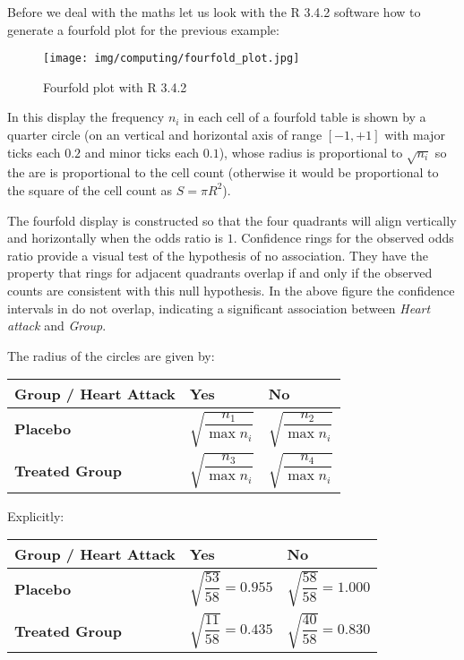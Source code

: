 	Before we deal with the maths let us look with the R 3.4.2 software how to generate a fourfold plot for the previous example:
	\begin{figure}[H]
		\centering
		\texttt{[image: img/computing/fourfold\_plot.jpg]}
		\caption{Fourfold plot with R 3.4.2}
	\end{figure}
	In this display the frequency $n_i$ in each cell of a fourfold table is shown by a quarter circle (on an vertical and horizontal axis of range $[-1,+1]$ with major ticks each $0.2$ and minor ticks each $0.1$), whose radius is proportional to $\sqrt{n_i}$ so the are is proportional to the cell count (otherwise it would be proportional to the square of the cell count as $S=\pi R^2$).
	
	The fourfold display is constructed so that the four quadrants will align vertically and horizontally when the odds ratio is $1$. Confidence rings for the observed odds ratio provide a visual test of the hypothesis of no association. They have the property that rings for adjacent quadrants overlap if and only if the observed counts are consistent with this null hypothesis. In the above figure the confidence intervals in do not overlap, indicating a significant association between \textit{Heart attack} and \textit{Group}. 
	
	The radius of the circles are given by:
	\begin{table}[H]
		\centering
		\begin{tabular}{|l|c|c|}
		\hline
		 Group / Heart Attack & \multicolumn{1}{l|}{\cellcolor[HTML]{9B9B9B}\textbf{Yes}} & \multicolumn{1}{l|}{\cellcolor[HTML]{9B9B9B}\textbf{No}} \\ \hline
		\cellcolor[HTML]{9B9B9B}\textbf{Placebo} & $\sqrt{\dfrac{n_1}{\max n_i}}$ & $\sqrt{\dfrac{n_2}{\max n_i}}$ \\ \hline
		\cellcolor[HTML]{9B9B9B}\textbf{Treated Group} & $\sqrt{\dfrac{n_3}{\max n_i}}$ & $\sqrt{\dfrac{n_4}{\max n_i}}$ \\ \hline
		\end{tabular}
	\end{table}
	Explicitly:
	\begin{table}[H]
		\centering
		\begin{tabular}{|l|c|c|}
		\hline
		 Group / Heart Attack & \multicolumn{1}{l|}{\cellcolor[HTML]{9B9B9B}\textbf{Yes}} & \multicolumn{1}{l|}{\cellcolor[HTML]{9B9B9B}\textbf{No}} \\ \hline
		\cellcolor[HTML]{9B9B9B}\textbf{Placebo} & $\sqrt{\dfrac{53}{58}}=0.955$ & $\sqrt{\dfrac{58}{58}}=1.000$ \\ \hline
		\cellcolor[HTML]{9B9B9B}\textbf{Treated Group} & $\sqrt{\dfrac{11}{58}}=0.435$ & $\sqrt{\dfrac{40}{58}}=0.830$ \\ \hline
		\end{tabular}
	\end{table}
	
